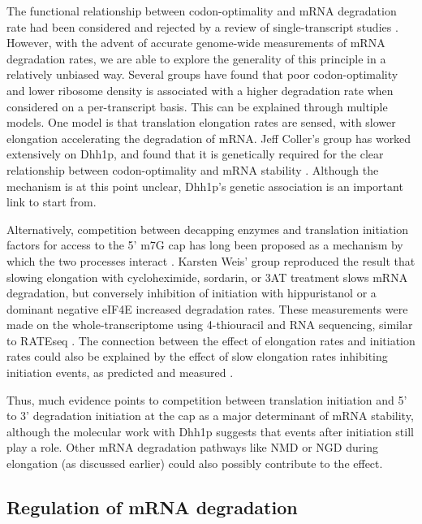 The functional relationship between codon-optimality
and mRNA degradation rate had been considered and rejected by a review
of single-transcript studies 
\parencite{caponigro1996mechanisms}. However,
with the advent of accurate genome-wide measurements of mRNA
degradation rates, we are able to explore the generality of this
principle in a relatively unbiased way. Several groups 
\parencite{presnyak2015codon,neymotin2016multiple,harigaya2016codon,cheng2017cis}
have found that poor codon-optimality and lower ribosome density
is associated with a higher degradation rate when considered on a
per-transcript basis. This can be explained through multiple models.
One model is that translation elongation rates are sensed, with slower
elongation accelerating the degradation of mRNA. Jeff Coller's group
has worked extensively on Dhh1p, and found that it is genetically
required for the clear relationship between codon-optimality and mRNA
stability 
\parencite{presnyak2015codon,radhakrishnan2016dead}. Although
the mechanism is at this point unclear, Dhh1p's genetic association 
is an important link to start from.

Alternatively, competition between
decapping enzymes and translation initiation factors for access to the
5' m7G cap has long been proposed as a mechanism by which the two
processes interact 
\parencite{schwartz1999mutations,schwartz2000mrna}. Karsten Weis' group 
\parencite{chan2017non} reproduced the result
that slowing elongation with cycloheximide, sordarin, or 3AT treatment
slows mRNA degradation, but conversely inhibition of initiation with
hippuristanol or a dominant negative eIF4E increased degradation
rates. These measurements were made on the whole-transcriptome using
4-thiouracil and RNA sequencing, similar to RATEseq 
\parencite{neymotin2014determination}. 
The connection between the effect of elongation rates and
initiation rates could also be explained by the effect of slow
elongation rates inhibiting initiation events, as predicted 
\parencite{shah2013rate} and measured \parencite{chu2014translation}.

Thus, much evidence points
to competition between translation initiation and 5' to 3' degradation
initiation at the cap as a major determinant of mRNA stability,
although the molecular work with Dhh1p suggests that events after
initiation still play a role. Other mRNA degradation pathways like NMD
or NGD during elongation (as discussed earlier) could also possibly
contribute to the effect.  

\subsection{ Regulation of mRNA degradation }

